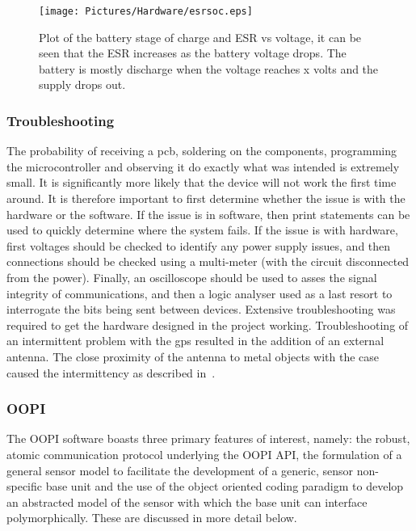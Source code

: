    
\begin{figure}
		    \centering
		    \texttt{[image: Pictures/Hardware/esrsoc.eps]}
		    \captionsetup{justification = centering}
			\caption{Plot of the battery stage of charge and ESR vs voltage, it can be seen that the ESR increases as the battery voltage drops. The battery is mostly discharge when the voltage reaches x volts and the supply drops out.}
			\label{Figure:JM_esrsoc}
    	\end{figure}
    	
\subsubsection{Troubleshooting} 
The probability of receiving a \gls{pcb}, soldering on the components, programming the microcontroller and observing it do exactly what was intended is extremely small. It is significantly more likely that the device will not work the first time around. It is therefore important to first determine whether the issue is with the hardware or the software. If the issue is in software, then print statements can be used to quickly determine where the system fails. If the issue is with hardware, first voltages should be checked to identify any power supply issues, and then connections should be checked using a multi-meter (with the circuit disconnected from the power). Finally, an oscilloscope should be used to asses the signal integrity of communications, and then a logic analyser used as a last resort to interrogate the bits being sent between devices. Extensive troubleshooting was required to get the hardware designed in the project working. Troubleshooting of an intermittent problem with the \gls{gps} resulted in the addition of an external antenna. The close proximity of the antenna to metal objects with the case caused the intermittency as described in~\cite{JM_antenna}. 
    	

\subsubsection{OOPI}
\label{sec:OOPI_Appendix}

The OOPI software boasts three primary features of interest, namely: the robust, atomic communication protocol underlying the OOPI API, the formulation of a general sensor model to facilitate the development of a generic, sensor non-specific base unit and the use of the object oriented coding paradigm to develop an abstracted model of the sensor with which the base unit can interface polymorphically. These are discussed in more detail below.

